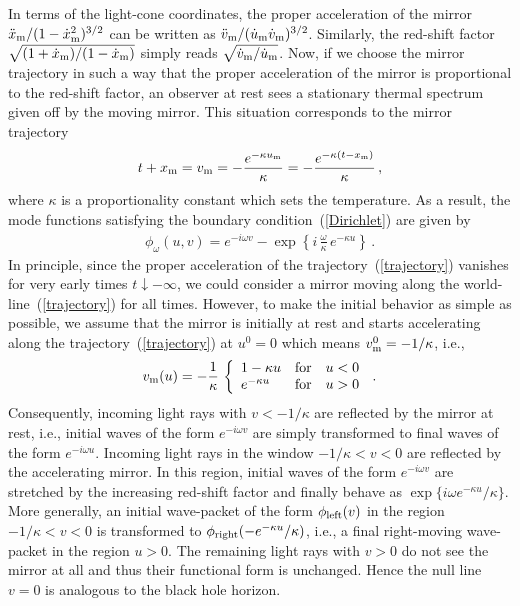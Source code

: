 \documentclass[aps,prd,showpacs,amssymb,nofootinbib,twocolumn]{revtex4}
\newcommand{\bea}{\begin{eqnarray}}
\newcommand{\ea}{\end{eqnarray}}
\begin{document}
In terms of the light-cone coordinates, the proper acceleration of the mirror 
$\ddot x_{\rm m}/(1-\dot x_{\rm m}^2)^{3/2}$ can be written as 
$\ddot v_{\rm m}/(\dot u_{\rm m}\dot v_{\rm m})^{3/2}$.
%
Similarly, the red-shift factor $\sqrt{(1+\dot x_{\rm m})/(1-\dot x_{\rm m})}$ 
simply reads $\sqrt{\dot v_{\rm m}/\dot u_{\rm m}}$.
%
Now, if we choose the mirror trajectory in such a way that the proper 
acceleration 
of the mirror is proportional to the red-shift factor, an observer at rest sees 
a stationary thermal spectrum given off by the moving mirror.
%
This situation corresponds to the mirror trajectory 
%
\bea
\label{trajectory}
t+x_{\rm m}
=
v_{\rm m}
=
-\frac{e^{-\kappa u_{\rm m}}}{\kappa}
=
-\frac{e^{-\kappa (t-x_{\rm m})}}{\kappa}
\,,
\ea
%
where $\kappa$ is a proportionality constant which sets the temperature.
%
As a result, the mode functions satisfying the boundary 
condition~(\ref{Dirichlet})
are given by 
%
\bea
\phi_\omega(u,v)
=
e^{-i\omega v}-\exp\left\{i\,\frac{\omega}{\kappa}\,e^{-\kappa u}\right\}
\,.
\ea
%
In principle, since the proper acceleration of the 
trajectory~(\ref{trajectory}) 
vanishes for very early times $t\downarrow-\infty$, we could consider a mirror 
moving along the world-line~(\ref{trajectory}) for all times. 
%
However, to make the initial behavior as simple as possible, we assume that 
the mirror is initially at rest and starts accelerating along the 
trajectory~(\ref{trajectory}) 
at $u^0=0$ which means $v_{\rm m}^0=-1/\kappa$, i.e., 
%
\bea
v_{\rm m}(u)
= 
-\frac{1}{\kappa}\,
\left\{
\begin{array}{lll}
1-\kappa u & {\rm for} & u<0 \\
e^{-\kappa u}
& {\rm for} & u>0
\end{array}
\right.
\,.
\ea
%
Consequently, incoming light rays with $v<-1/\kappa$ are reflected by the 
mirror at rest, i.e., initial waves of the form $e^{-i\omega v}$ are simply 
transformed to final waves of the form $e^{-i\omega u}$. 
%
Incoming light rays in the window $-1/\kappa<v<0$ are reflected by the 
accelerating mirror.
%
In this region, initial waves of the form $e^{-i\omega v}$ are stretched by the 
increasing red-shift factor and finally behave as 
$\exp\{i\omega e^{-\kappa u}/\kappa\}$.
%
More generally, an initial wave-packet of the form $\phi_{\rm left}(v)$ in the 
region $-1/\kappa<v<0$ is transformed to $\phi_{\rm right}(-e^{-\kappa u}/\kappa)$,
i.e., a final right-moving wave-packet in the region $u>0$. 
%
The remaining light rays with $v>0$ do not see the mirror at all and thus their 
functional form is unchanged. 
%
Hence the null line $v=0$ is analogous to the black hole horizon.
\end{document}
